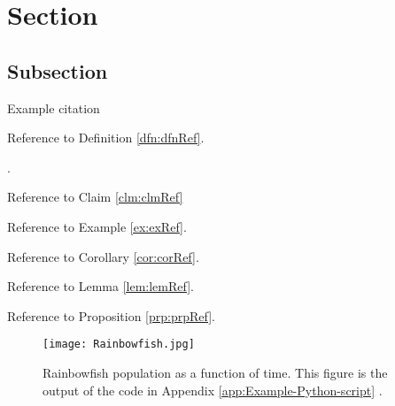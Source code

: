 \section{Section}\label{sse:Section}

\subsection{Subsection}\label{sss:Subsection}

Example citation \citep{baarslag2015learning}


Reference to Definition \ref{dfn:dfnRef}.


.


Reference to Claim \ref{clm:clmRef}


Reference to Example \ref{ex:exRef}.




Reference to Corollary \ref{cor:corRef}.


Reference to Lemma \ref{lem:lemRef}.


Reference to Proposition \ref{prp:prpRef}.

\begin{figure}[H]
    \centering
    \texttt{[image: Rainbowfish.jpg]}
    \caption{Rainbowfish population as a function of time.
        This figure is the output of the code in Appendix \ref{app:Example-Python-script}  \citep{tudelftopencourseware}.}
    \label{fig:Rainbowfish}
\end{figure}